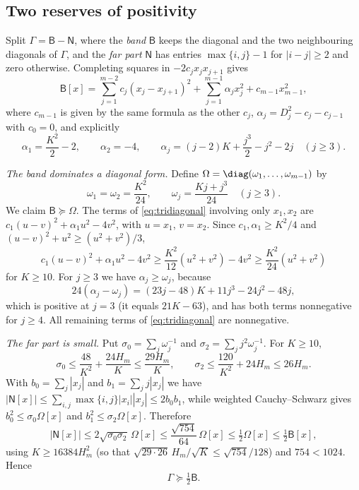\subsection{Two reserves of positivity}\label{sec:app-reserves}

Split $\Gamma=\mathsf B-\mathsf N$, where the \emph{band} $\mathsf B$
keeps the diagonal and the two neighbouring diagonals of $\Gamma$, and the
\emph{far part} $\mathsf N$ has entries $\max\{i,j\}-1$ for $|i-j|\ge2$
and zero otherwise. Completing squares in $-2c_jx_jx_{j+1}$ gives
\begin{equation}\label{eq:tridiagonal}
 \mathsf B[x]=\sum_{j=1}^{m-2}c_j(x_j-x_{j+1})^2
              +\sum_{j=1}^{m-1}\alpha_jx_j^2+c_{m-1}x_{m-1}^2,
\end{equation}
where $c_{m-1}$ is given by the same formula as the other $c_j$,
$\alpha_j=D_j^2-c_j-c_{j-1}$ with $c_0=0$, and explicitly
\[
 \alpha_1=\frac{K^2}2-2,\qquad \alpha_2=-4,\qquad
 \alpha_j=(j-2)K+\frac{j^3}2-j^2-2j\quad(j\ge3).
\]

\emph{The band dominates a diagonal form.} Define
$\Omega=\diag(\omega_1,\dots,\omega_{m-1})$ by
\[
 \omega_1=\omega_2=\frac{K^2}{24},\qquad \omega_j=\frac{Kj+j^3}{24}\quad(j\ge3).
\]
We claim $\mathsf B\succeq\Omega$. The terms of \eqref{eq:tridiagonal}
involving only $x_1,x_2$ are $c_1(u-v)^2+\alpha_1u^2-4v^2$, with
$u=x_1$, $v=x_2$. Since $c_1,\alpha_1\ge K^2/4$ and
$(u-v)^2+u^2\ge(u^2+v^2)/3$,
\[
 c_1(u-v)^2+\alpha_1u^2-4v^2
 \ge\frac{K^2}{12}(u^2+v^2)-4v^2
 \ge\frac{K^2}{24}(u^2+v^2)
\]
for $K\ge10$. For $j\ge3$ we have $\alpha_j\ge\omega_j$, because
\[
 24(\alpha_j-\omega_j)=(23j-48)K+11j^3-24j^2-48j,
\]
which is positive at $j=3$ (it equals $21K-63$), and has both terms
nonnegative for $j\ge4$. All remaining terms of \eqref{eq:tridiagonal}
are nonnegative.

\emph{The far part is small.} Put $\sigma_0=\sum_j\omega_j^{-1}$ and
$\sigma_2=\sum_jj^2\omega_j^{-1}$. For $K\ge10$,
\[
 \sigma_0\le\frac{48}{K^2}+\frac{24H_m}{K}\le\frac{29H_m}{K},
 \qquad
 \sigma_2\le\frac{120}{K^2}+24H_m\le26H_m.
\]
With $b_0=\sum_j|x_j|$ and $b_1=\sum_jj|x_j|$ we have
$|\mathsf N[x]|\le\sum_{i,j}\max\{i,j\}|x_i||x_j|\le2b_0b_1$, while
weighted Cauchy--Schwarz gives $b_0^2\le\sigma_0\Omega[x]$ and
$b_1^2\le\sigma_2\Omega[x]$. Therefore
\begin{equation}\label{eq:remainder}
 |\mathsf N[x]|
 \le2\sqrt{\sigma_0\sigma_2}\,\Omega[x]
 \le\frac{\sqrt{754}}{64}\,\Omega[x]
 \le\tfrac12\Omega[x]\le\tfrac12\mathsf B[x],
\end{equation}
using $K\ge16384H_m^2$ (so that $\sqrt{29\cdot26}\,H_m/\sqrt K\le\sqrt{754}/128$)
and $754<1024$. Hence
\[
 \Gamma\succeq\tfrac12\mathsf B.
\]

